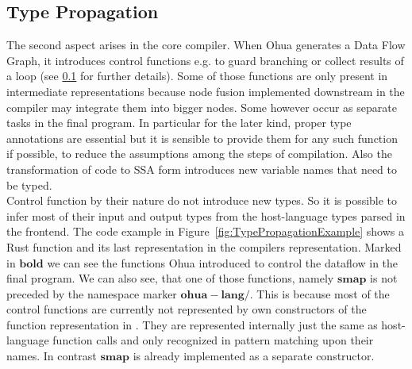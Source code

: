 \subsection{Type Propagation}
The second aspect arises in the core compiler. When Ohua generates a Data Flow Graph, it introduces control functions e.g. to guard branching or collect results of a loop (see \ref{} for further details). Some of those functions are only present in intermediate representations because node fusion implemented downstream in the compiler may integrate them into bigger nodes. Some however occur as separate tasks in the final program. In particular for the later kind, proper type annotations are essential but it is sensible to provide them for any such function if possible, to reduce the assumptions among the steps of compilation. Also the transformation of code to SSA form introduces new variable names that need to be typed.\\

Control function by their nature do not introduce new types. So it is possible to infer most of their input and output types from the host-language types parsed in the frontend. The code example in Figure~\ref{fig:TypePropagationExample} shows a Rust function and its last representation in the compilers  representation. Marked in $\mathbf{bold}$ we can see the functions Ohua introduced to control the dataflow in the final program. We can also see, that one of those functions, namely $\mathbf{smap}$ is not preceded by the namespace marker $\mathbf{ohua-lang/}$. This is because most of the control functions are currently not represented by own constructors of the function representation in . They are represented internally just the same as host-language function calls and only recognized in pattern matching upon their names. In contrast $\mathbf{smap}$ is already implemented as a separate constructor. 

